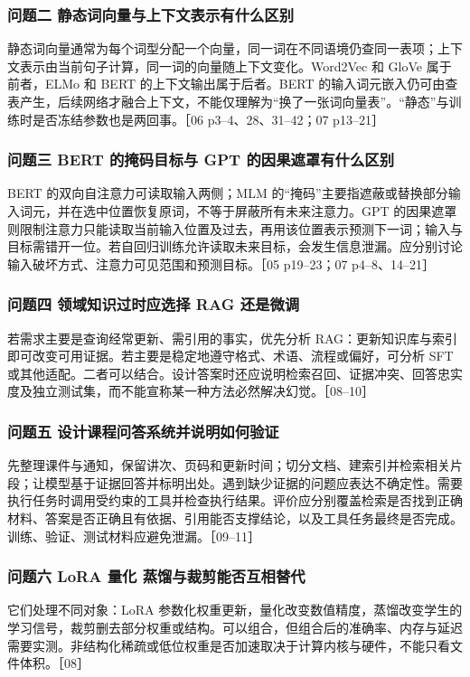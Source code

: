 \documentclass[UTF8,a4paper,zihao=-4,fontset=windows]{ctexart}
\begin{document}
\subsubsection*{问题二 静态词向量与上下文表示有什么区别}
静态词向量通常为每个词型分配一个向量，同一词在不同语境仍查同一表项；上下文表示由当前句子计算，同一词的向量随上下文变化。Word2Vec 和 GloVe 属于前者，ELMo 和 BERT 的上下文输出属于后者。BERT 的输入词元嵌入仍可由查表产生，后续网络才融合上下文，不能仅理解为“换了一张词向量表”。“静态”与训练时是否冻结参数也是两回事。［06 p3--4、28、31--42；07 p13--21］

\subsubsection*{问题三 BERT 的掩码目标与 GPT 的因果遮罩有什么区别}
BERT 的双向自注意力可读取输入两侧；MLM 的“掩码”主要指遮蔽或替换部分输入词元，并在选中位置恢复原词，不等于屏蔽所有未来注意力。GPT 的因果遮罩则限制注意力只能读取当前输入位置及过去，再用该位置表示预测下一词；输入与目标需错开一位。若自回归训练允许读取未来目标，会发生信息泄漏。应分别讨论输入破坏方式、注意力可见范围和预测目标。［05 p19--23；07 p4--8、14--21］

\subsubsection*{问题四 领域知识过时应选择 RAG 还是微调}
若需求主要是查询经常更新、需引用的事实，优先分析 RAG：更新知识库与索引即可改变可用证据。若主要是稳定地遵守格式、术语、流程或偏好，可分析 SFT 或其他适配。二者可以结合。设计答案时还应说明检索召回、证据冲突、回答忠实度及独立测试集，而不能宣称某一种方法必然解决幻觉。［08--10］

\subsubsection*{问题五 设计课程问答系统并说明如何验证}
先整理课件与通知，保留讲次、页码和更新时间；切分文档、建索引并检索相关片段；让模型基于证据回答并标明出处。遇到缺少证据的问题应表达不确定性。需要执行任务时调用受约束的工具并检查执行结果。评价应分别覆盖检索是否找到正确材料、答案是否正确且有依据、引用能否支撑结论，以及工具任务最终是否完成。训练、验证、测试材料应避免泄漏。［09--11］

\subsubsection*{问题六 LoRA 量化 蒸馏与裁剪能否互相替代}
它们处理不同对象：LoRA 参数化权重更新，量化改变数值精度，蒸馏改变学生的学习信号，裁剪删去部分权重或结构。可以组合，但组合后的准确率、内存与延迟需要实测。非结构化稀疏或低位权重是否加速取决于计算内核与硬件，不能只看文件体积。［08］
\end{document}
